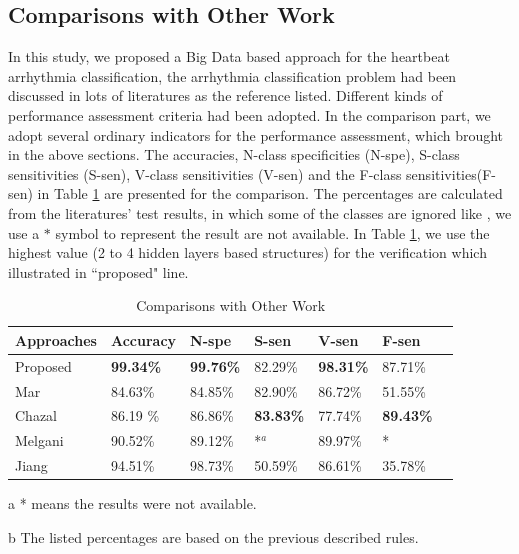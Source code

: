 \documentclass[journal]{IEEEtran}
\begin{document}



\subsection{Comparisons with Other Work}
In this study, we proposed a Big Data based approach for the heartbeat arrhythmia classification, the arrhythmia classification problem had been discussed in lots of literatures as the reference listed. Different kinds of performance assessment criteria had been adopted. In the comparison part, we adopt several ordinary indicators for the performance assessment, which brought in the above sections. The accuracies, N-class specificities (N-spe), S-class sensitivities (S-sen), V-class sensitivities (V-sen) and the F-class sensitivities(F-sen) in Table \ref{table9} are presented for the comparison. The percentages are calculated from the literatures' test results, in which some of the classes are ignored like \cite{melgan}, we use a $*$ symbol to represent the result are not available. 
In Table \ref{table9}, we use the highest value (2 to 4 hidden layers based structures) for the verification which illustrated in ``proposed" line.

\begin{table}[!htbp]
\begin{center}
\begin{threeparttable}
\caption{Comparisons with Other Work}
\label{table9}
\begin{tabular}{lllllll}
\hline

Approaches            &  Accuracy & N-spe & S-sen & V-sen & F-sen \\
\hline
 Proposed             & \textbf{99.34\%}  & \textbf{99.76\%} &  82.29\% & \textbf{98.31\%} & 87.71\% \\
 Mar\cite{mar}        & 84.63\%  & 84.85\% & 82.90\%  & 86.72\% & 51.55\% \\
 Chazal\cite{chaza}   & 86.19 \% & 86.86\% & \textbf{83.83\%}  & 77.74\% & \textbf{89.43\%} \\
 Melgani\cite{melgan} & 90.52\%  & 89.12\% & *$^a$    & 89.97\% & * \\
 Jiang \cite{jiang}   & 94.51\%  & 98.73\% & 50.59\%  & 86.61\% & 35.78\% \\
\hline
\end{tabular}
\begin{tablenotes}
\item [a] * means the results were not available.
\item [b] The listed percentages are based on the previous described rules.
\end{tablenotes}
\end{threeparttable}
\end{center}
\end{table}
\end{document}
